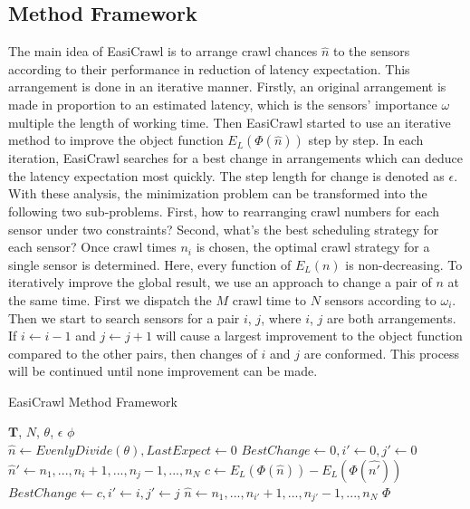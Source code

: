 \documentclass[conference]{IEEEtran}
\begin{document}
\subsection{Method Framework}
The main idea of EasiCrawl is to arrange crawl chances $\hat{n}$ to the sensors according to their performance in reduction of latency expectation. This arrangement is done in an iterative manner.
Firstly, an original arrangement is made in proportion to an estimated latency, which is the sensors' importance $\omega$ multiple the length of working time.
Then EasiCrawl started to use an iterative method to improve the object function $E_L(\Phi(\hat{n}))$ step by step. 
In each iteration, EasiCrawl searches for a best change in arrangements which can deduce the latency expectation most quickly.
The step length for change is denoted as $\epsilon$.
With these analysis, the minimization problem can be transformed into the following two sub-problems.
First, how to rearranging crawl numbers for each sensor under two constraints? Second, what's the best scheduling strategy for each sensor? 
Once crawl times $n_i$ is chosen, the optimal crawl strategy for a single sensor is determined. Here, every function of $E_L(n)$ is non-decreasing. 
To iteratively improve the global result, we use an approach to change a pair of $n$ at the same time.
First we dispatch the $M$ crawl time to $N$ sensors according to $\omega_i$. Then we start to search sensors for a pair $i$, $j$, where $i$, $j$ are both arrangements. If $i\gets i-1$ and $j\gets j+1$ will cause a largest improvement to the object function compared to the other pairs, then changes of $i$ and $j$ are conformed. This process will be continued until none improvement can be made. 

\begin{algorithm}
	\caption{EasiCrawl Method Framework}
	\label{alg:framework}
	\begin{algorithmic}[1]
		\renewcommand{\algorithmicrequire}{\textbf{Input:}}
		\renewcommand{\algorithmicensure}{\textbf{Output:}}
		\REQUIRE $\mathbf{T}$, $N$, $\theta$, $\epsilon$
		\ENSURE  $\phi$
		\\ 
		\STATE $\hat{n}\gets EvenlyDivide(\theta), LastExpect\gets 0$
		\STATE $BestChange \gets 0, i'\gets 0, j'\gets 0$		
		\STATE $\hat{n}'\gets n_1,...,n_i+1,...,n_j-1,...,n_N$
		\STATE $c\gets E_L(\Phi(\hat{n})) - E_L(\Phi(\hat{n'}))$
		\STATE $BestChange \gets c, i'\gets i, j'\gets j$
		\ENDIF
		\ENDFOR
		\STATE $\hat{n}\gets n_1,...,n_{i'}+1,...,n_{j'}-1,...,n_N$
		\ENDWHILE 
		\RETURN $\Phi$
	\end{algorithmic} 
\end{algorithm}
\end{document}
